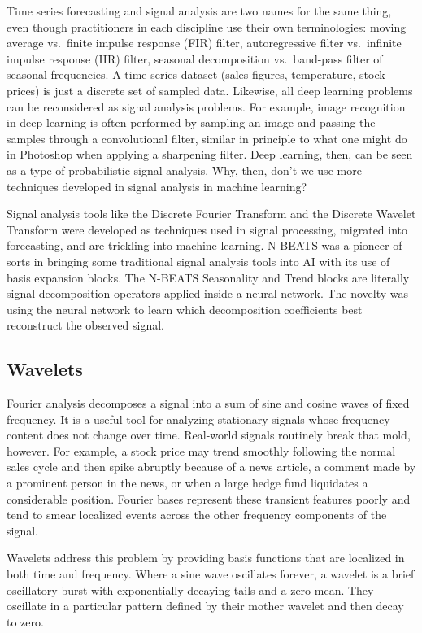 \documentclass[11pt,a4paper]{article}
\begin{document}
Time series forecasting and signal analysis are two names for the same thing, even though practitioners in each discipline use their own terminologies: moving average vs.\ finite impulse response (FIR) filter, autoregressive filter vs.\ infinite impulse response (IIR) filter, seasonal decomposition vs.\ band-pass filter of seasonal frequencies. A time series dataset (sales figures, temperature, stock prices) is just a discrete set of sampled data. Likewise, all deep learning problems can be reconsidered as signal analysis problems. For example, image recognition in deep learning is often performed by sampling an image and passing the samples through a convolutional filter, similar in principle to what one might do in Photoshop when applying a sharpening filter. Deep learning, then, can be seen as a type of probabilistic signal analysis. Why, then, don't we use more techniques developed in signal analysis in machine learning?

Signal analysis tools like the Discrete Fourier Transform and the Discrete Wavelet Transform were developed as techniques used in signal processing, migrated into forecasting, and are trickling into machine learning. N-BEATS was a pioneer of sorts in bringing some traditional signal analysis tools into AI with its use of basis expansion blocks. The N-BEATS Seasonality and Trend blocks are literally signal-decomposition operators applied inside a neural network. The novelty was using the neural network to learn which decomposition coefficients best reconstruct the observed signal.

\subsection{Wavelets}

Fourier analysis decomposes a signal into a sum of sine and cosine waves of fixed frequency. It is a useful tool for analyzing stationary signals whose frequency content does not change over time. Real-world signals routinely break that mold, however. For example, a stock price may trend smoothly following the normal sales cycle and then spike abruptly because of a news article, a comment made by a prominent person in the news, or when a large hedge fund liquidates a considerable position. Fourier bases represent these transient features poorly and tend to smear localized events across the other frequency components of the signal.

Wavelets address this problem by providing basis functions that are localized in both time and frequency. Where a sine wave oscillates forever, a wavelet is a brief oscillatory burst with exponentially decaying tails and a zero mean. They oscillate in a particular pattern defined by their mother wavelet and then decay to zero.
\end{document}
